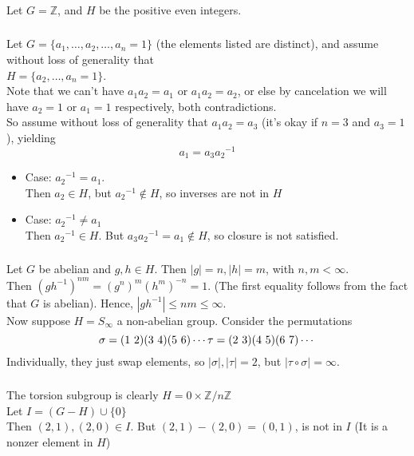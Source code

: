 \documentclass{article}
\newcommand{\ints}{\mathbb{Z}}
\newcommand{\set}[1]{ \{ #1 \} }
\newcommand{\inv}[1]{ {#1}^{-1} }
\newcommand{\comp}{ \circ }
\begin{document}
\subsubsection{}\label{ex1p4}
Let $G=\ints$, and $H$ be the positive even integers.

\subsubsection{}\label{ex1p5}
Let $G=\set{a_1,\ldots,a_2,\ldots,a_n=1}$ (the elements listed are distinct), and assume without loss of generality that\\
$H = \set{a_2,\ldots,a_n=1}$.\\
Note that we can't have $a_1a_2=a_1$ or $a_1a_2=a_2$, or else by cancelation we will have $a_2=1$ or $a_1=1$ respectively, both contradictions.\\
So assume without loss of generality that $a_1a_2=a_3$ 
(it's okay if $n=3$ and $a_3=1$), yielding
\begin{equation}
a_1 = a_3\inv{a_2}
\end{equation}
\begin{itemize}
\item Case: $\inv{a_2} = a_1$.\\
Then $a_2\in H$, but $\inv{a_2} \notin H$, so inverses are not in $H$
\item Case: $\inv{a_2} \neq a_1$\\
Then $\inv{a_2} \in H$. But $a_3\inv{a_2} = a_1 \notin H$, so closure is not satisfied.
\end{itemize}
\subsubsection{}\label{ex1p6}
Let $G$ be abelian and $g,h \in H$. Then $|g|=n,|h|=m$, with $n,m<\infty$.\\
Then $(g\inv{h})^{nm} = (g^n)^m(h^m)^{-n} = 1$. (The first equality follows from the fact that $G$ is abelian). Hence, $|g\inv{h}| \leq nm \leq \infty$.\\
Now suppose $H=S_{\infty}$ a non-abelian group. Consider the permutations
\begin{equation}
\sigma = (1\ 2)(3\ 4)(5\ 6)\cdots\\
\tau = (2\ 3)(4\ 5)(6\ 7)\cdots
\end{equation}
Individually, they just swap elements, so $|\sigma|,|\tau| = 2$, but $|\tau\comp\sigma| = \infty$. 
\subsubsection{}\label{ex1p7}
The torsion subgroup is clearly $H= 0\times \ints/n\ints$\\
Let $I = (G-H)\cup\set{0}$\\
Then $(2,1),(2,0)\in I$. But $(2,1)-(2,0) = (0,1)$, is not in $I$ (It is a nonzer element in $H$)
\end{document}
